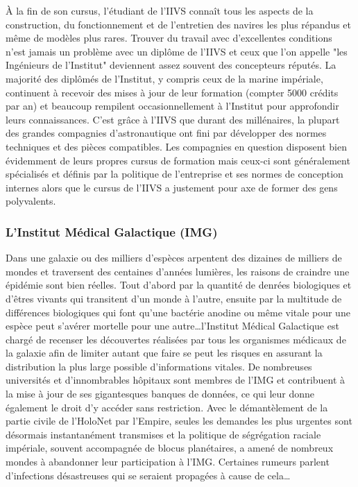 \documentclass[twoside]{article}
\begin{document}
À la fin de son cursus, l'étudiant de l'IIVS conna\^{i}t tous les aspects de la construction, du fonctionnement et de l'entretien des navires les plus répandus et même de modèles plus rares. Trouver du travail avec d'excellentes conditions n'est jamais un problème avec un diplôme de l'IIVS et ceux que l'on appelle "les Ingénieurs de l'Institut" deviennent assez souvent des concepteurs réputés. La majorité des diplômés de l'Institut, y compris ceux de la marine impériale, continuent à recevoir des  mises à jour de leur formation (compter 5000 crédits par an) et beaucoup rempilent occasionnellement à l'Institut pour approfondir leurs connaissances. C'est grâce à l'IIVS que durant des millénaires, la plupart des grandes compagnies d'astronautique ont fini par développer des normes techniques et des pièces compatibles. Les compagnies en question disposent bien évidemment de leurs propres cursus de formation mais ceux-ci sont généralement spécialisés et définis par la politique de l'entreprise et ses normes de conception internes alors que le cursus de l'IIVS a justement pour axe de former des gens polyvalents.

\subsubsection{L'Institut Médical Galactique (IMG)}
Dans une galaxie ou des milliers d'espèces arpentent des dizaines de milliers de mondes et traversent des centaines d'années lumières, les raisons de craindre une épidémie sont bien réelles. Tout d'abord par la quantité de denrées biologiques et d'êtres vivants qui transitent d'un monde à l'autre, ensuite par la multitude de différences biologiques qui font qu'une bactérie anodine ou même vitale pour une espèce peut s'avérer mortelle pour une autre\ldots l'Institut Médical Galactique est chargé de recenser les découvertes réalisées par tous les organismes médicaux de la galaxie afin de limiter autant que faire se peut les risques en assurant la distribution la plus large possible d'informations vitales. De nombreuses universités et d'innombrables hôpitaux sont membres de l'IMG et contribuent à la mise à jour de ses gigantesques banques de données, ce qui leur donne également le droit d'y accéder sans restriction. Avec le démantèlement de la partie civile de l'HoloNet par l'Empire, seules les demandes les plus urgentes sont désormais instantanément transmises et la politique de ségrégation raciale impériale, souvent accompagnée de blocus planétaires, a amené de nombreux mondes à abandonner leur participation à l'IMG. Certaines rumeurs parlent d'infections désastreuses qui se seraient propagées à cause de cela\ldots
\end{document}

